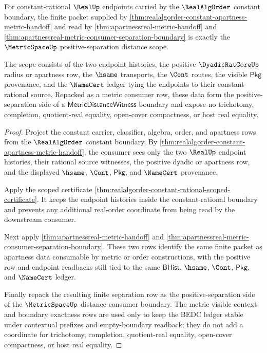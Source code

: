 \begin{theorem}
\label{thm:metric-realalgorder-apartness-distance-scope}
For constant-rational $\RealUp$ endpoints carried by the $\RealAlgOrder$
constant boundary, the finite packet supplied by
\autoref{thm:realalgorder-constant-apartness-metric-handoff} and read by
\autoref{thm:apartnessreal-metric-handoff} and
\autoref{thm:apartnessreal-metric-consumer-separation-boundary} is exactly the
$\MetricSpaceUp$ positive-separation distance scope.

The scope consists of the two endpoint histories, the positive
$\DyadicRatCoreUp$ radius or apartness row, the $\hsame$ transports, the
$\Cont$ routes, the visible $\mathsf{Pkg}$ provenance, and the $\NameCert$
ledger tying the endpoints to their constant-rational source. Repacked as a
metric consumer row, these data form the positive-separation side of a
$\mathsf{MetricDistanceWitness}$ boundary and expose no trichotomy,
completion, quotient-real equality, open-cover compactness, or host real
equality.
\end{theorem}
\begin{proof}
Project the constant carrier, classifier, algebra, order, and apartness rows
from the $\RealAlgOrder$ constant boundary. By
\autoref{thm:realalgorder-constant-apartness-metric-handoff}, the consumer sees
only the two $\RealUp$ endpoint histories, their rational source witnesses, the
positive dyadic or apartness row, and the displayed $\hsame$, $\Cont$,
$\mathsf{Pkg}$, and $\NameCert$ provenance.

Apply the scoped certificate
\autoref{thm:realalgorder-constant-rational-scoped-certificate}. It keeps the
endpoint histories inside the constant-rational boundary and prevents any
additional real-order coordinate from being read by the downstream consumer.

Next apply \autoref{thm:apartnessreal-metric-handoff} and
\autoref{thm:apartnessreal-metric-consumer-separation-boundary}. These two
rows identify the same finite packet as apartness data consumable by metric
or order constructions, with the positive row and endpoint readbacks still
tied to the same $\mathsf{BHist}$, $\hsame$, $\Cont$, $\mathsf{Pkg}$, and
$\NameCert$ ledger.

Finally repack the resulting finite separation row as the positive-separation
side of the $\MetricSpaceUp$ distance consumer boundary. The metric
visible-context and boundary exactness rows are used only to keep the BEDC
ledger stable under contextual prefixes and empty-boundary readback; they do
not add a coordinate for trichotomy, completion, quotient-real equality,
open-cover compactness, or host real equality.
\end{proof}

